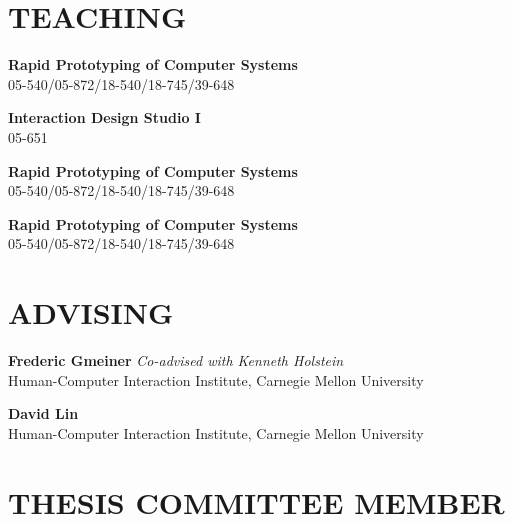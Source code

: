 \documentclass[11pt]{article} %
\begin{document}

\section*{\uppercase{Teaching}}
 \textbf{Rapid Prototyping of Computer Systems}\\
05-540/05-872/18-540/18-745/39-648\\
\medskip


 \textbf{Interaction Design Studio I}\\
05-651
\medskip

 \textbf{Rapid Prototyping of Computer Systems}\\
05-540/05-872/18-540/18-745/39-648\\
\medskip

 \textbf{Rapid Prototyping of Computer Systems}\\
05-540/05-872/18-540/18-745/39-648\\


\section*{\uppercase{Advising}}
 \textbf{Frederic Gmeiner} \textit{Co-advised with Kenneth Holstein}\\
Human-Computer Interaction Institute, Carnegie Mellon University
\medskip

 \textbf{David Lin}\\
Human-Computer Interaction Institute, Carnegie Mellon University


\section*{\uppercase{Thesis committee member}}
\end{document}
